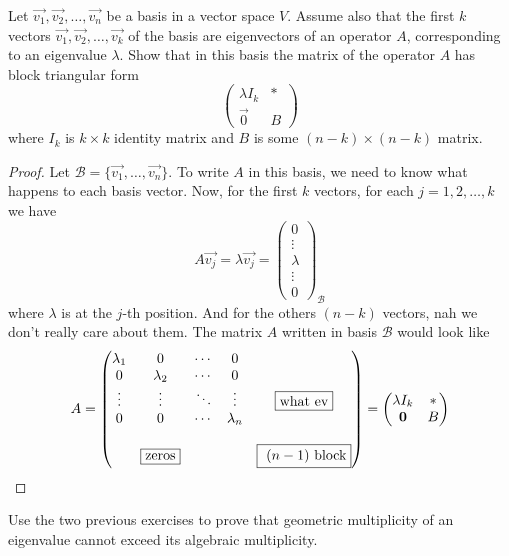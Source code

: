 \begin{exercise}
  Let $\vec{v_1},\vec{v_2},\dots,\vec{v_n}$ be a basis in a vector 
  space $V$. Assume also that the first $k$ vectors 
  $\vec{v_1},\vec{v_2},\dots,\vec{v_k}$ of the basis are eigenvectors
  of an operator $A$, corresponding to an eigenvalue $\lambda$. Show
  that in this basis the matrix of the operator $A$ has block 
  triangular form 
  \[\begin{pmatrix}\lambda I_k&*\\\vec{0}&B\end{pmatrix}\]
  where $I_k$ is $k\times k$ identity matrix and $B$ is some 
  $(n-k)\times (n-k)$ matrix.
\end{exercise}
\begin{proof}
  Let $\mathcal B=\{\vec{v_1},\dots,\vec{v_n}\}$. To write $A$ in this
  basis, we need to know what happens to each basis vector. Now, 
  for the first $k$ vectors, for each $j=1,2,\dots,k$ we have
  \[
    A\vec{v_j}=\lambda\vec{v_j}=
    \begin{pmatrix}0\\\vdots\\\lambda\\\vdots\\0\end{pmatrix}
    _{\mathcal B}
  \]
  where $\lambda$ is at the $j$-th position. And for the others
  $(n-k)$ vectors, nah we don't really care about them. The matrix 
  $A$ written in basis $\mathcal B$ would look like
  \[
    A=
    \begin{pmatrix}
      \lambda_1 & 0 & \cdots & 0 & \\
      0 & \lambda_2 & \cdots & 0 & \\
      \vdots & \vdots & \ddots & \vdots & \text{\fbox{what ev}}\\
      0 & 0 & \cdots & \lambda_n & \\
        &&&&\\
        & \text{\fbox{zeros}} &&&\text{\fbox{ $(n-1)$ block}}
    \end{pmatrix}=
    \begin{pmatrix}
      \lambda I_k&*\\\vec{0}&B
    \end{pmatrix}
  \]
\end{proof}
\begin{exercise}
  Use the two previous exercises to prove that geometric multiplicity
  of an eigenvalue cannot exceed its algebraic multiplicity.
\end{exercise}
